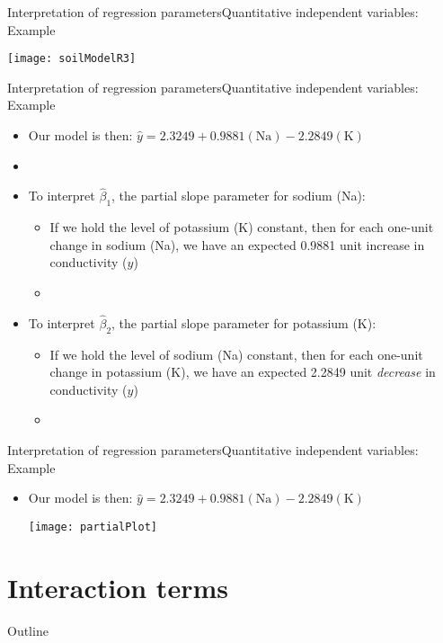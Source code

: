 \documentclass[xcolor=dvipsnames]{beamer}
\begin{document}
\begin{frame}{Interpretation of regression parameters}{Quantitative independent variables: Example}
	\begin{center}
		\texttt{[image: soilModelR3]}
	\end{center}
\end{frame}

\begin{frame}{Interpretation of regression parameters}{Quantitative independent variables: Example}
	\begin{itemize}
		\item Our model is then: $\hat{y} = 2.3249 + 0.9881(\text{Na}) - 2.2849(\text{K})$ \pause
		\item[]
		\item To interpret $\hat{\beta}_1$, the partial slope parameter for sodium (Na): \pause
		\begin{itemize}
			\item If we hold the level of potassium (K) constant, then for each one-unit change in sodium (Na), we have an expected 0.9881 unit increase in conductivity ($y$) \pause
			\item[]
		\end{itemize}
			\item To interpret $\hat{\beta}_2$, the partial slope parameter for potassium (K): \pause
	\begin{itemize}
		\item If we hold the level of sodium (Na) constant, then for each one-unit change in potassium (K), we have an expected 2.2849 unit \emph{decrease} in conductivity ($y$)
		\item[]
	\end{itemize}
	\end{itemize}
\end{frame}

\begin{frame}{Interpretation of regression parameters}{Quantitative independent variables: Example}
	\begin{itemize}
		\item Our model is then: $\hat{y} = 2.3249 + 0.9881(\text{Na}) - 2.2849(\text{K})$ \pause
		\begin{center}
			\texttt{[image: partialPlot]}
		\end{center}
	\end{itemize}
\end{frame}

\section{Interaction terms}
\begin{frame}{Outline}
	\tableofcontents[currentsection,subsectionstyle=show/shaded/hide]
\end{frame}
\end{document}
